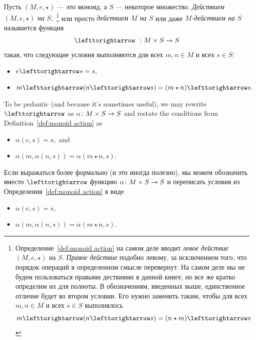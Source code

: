 \documentclass[CT4S-EN-RU]{subfiles}
\begin{document}
\begin{definitionRUS}\label{def:monoid action}
Пусть $(M,e,\star)$ — это моноид, а $S$ — некоторое множество. {\em Действием $(M,e,\star)$ на $S,$}%
\footnote{Определение~\ref{def:monoid action} на самом деле вводит {\em левое действие} $(M,e,\star)$ на $S.$ {\em Правое действие} подобно левому, за исключением того, что порядок операций в определенном смысле перевернут. На самом деле мы не будем пользоваться правыми дествиями в данной книге, но все же кратко определим их для полноты. В обозначениям, введенных выше, единственное отличие будет во втором условии. Его нужно заменить таким, чтобы для всех $m,n\in M$ и всех $s\in S$ выполнялось
$$m\acts(n\acts s)=(n\star m)\acts s$$}
или просто {\em действием $M$ на $S$} или даже {\em $M$-действием на $S$} называется функция $$\acts\;\;\taking M\times S\to S$$ такая, что следующие условия выполняются для всех $m,n\in M$ и всех $s\in S$:
\begin{itemize}
\item $e\acts s=s,$
\item $m\acts(n\acts s)=(m\star n)\acts s.$
\end{itemize}
\end{definitionRUS}

\begin{remarkENG}\label{rmk:monoid action}
To be pedantic (and because it's sometimes useful), we may rewrite $\acts$ as $\alpha\colon M\times S\rightarrow S$ and restate the conditions from Definition~\ref{def:monoid action} as
\begin{itemize}
\item $\alpha(e,s)=s,$ and
\item $\alpha(m,\alpha(n,s))=\alpha(m\star n,s).$
\end{itemize}
\end{remarkENG}

\begin{remarkRUS}\label{rmk:monoid action}
Если выражаться более формально (и это иногда полезно), мы можем обозначить вместо $\acts$ функцию $\alpha\colon M\times S\rightarrow S$ и переписать условия из Определения~\ref{def:monoid action} в виде
\begin{itemize}
\item $\alpha(e,s)=s,$
\item $\alpha(m,\alpha(n,s))=\alpha(m\star n,s).$
\end{itemize}
\end{remarkRUS}
\end{document}
